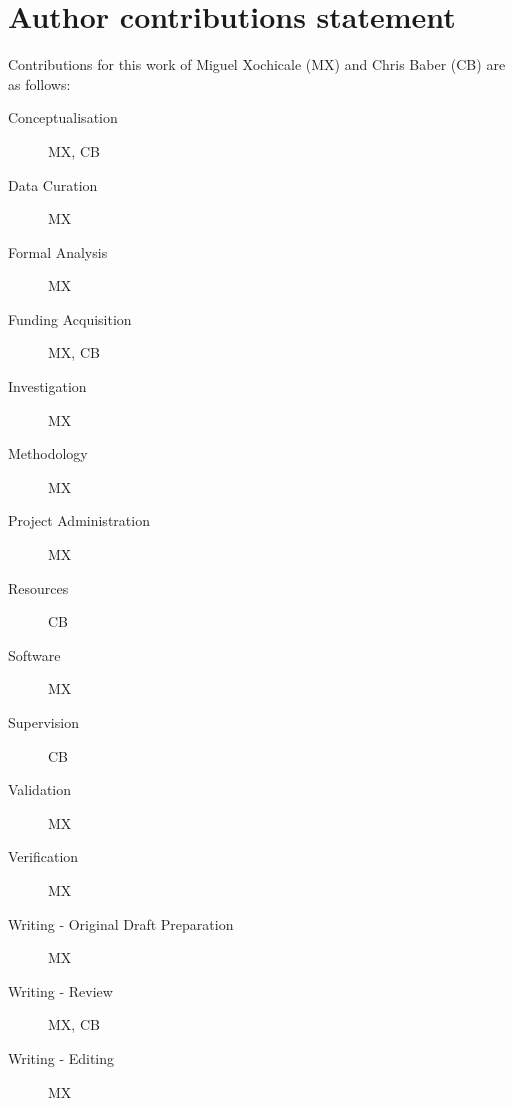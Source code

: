 \documentclass[fleqn,10pt]{wlscirep}
\begin{document}
\section*{Author contributions statement}
Contributions for this work of 
Miguel Xochicale (MX) and Chris Baber (CB) are as follows:
\begin{description}
\item[Conceptualisation] MX, CB
\item[Data Curation] MX
\item[Formal Analysis] MX
\item[Funding Acquisition] MX, CB
\item[Investigation] MX
\item[Methodology] MX
\item[Project Administration] MX
\item[Resources] CB
\item[Software] MX
\item[Supervision] CB
\item[Validation] MX
\item[Verification] MX
\item[Writing - Original Draft Preparation] MX
\item[Writing - Review] MX, CB
\item[Writing - Editing] MX
\end{description}

%
%
%
%

%
\end{document}
